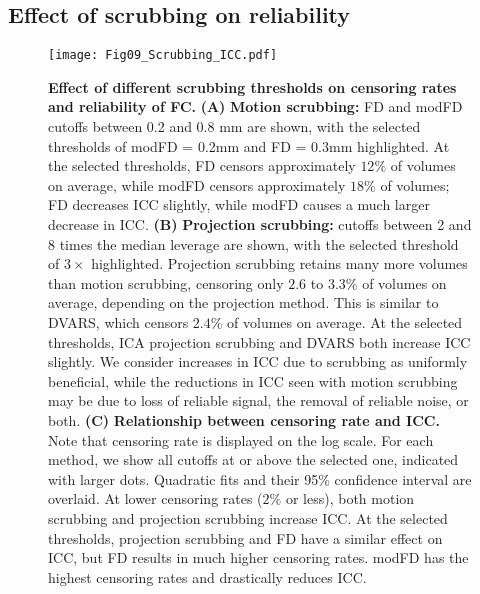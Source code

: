 \documentclass{article}
\begin{document}
\subsection{Effect of scrubbing on reliability}

\begin{figure}
    \centering
    \texttt{[image: Fig09\_Scrubbing\_ICC.pdf]}
    \caption{\small 
    \textbf{Effect of different scrubbing thresholds on censoring rates and reliability of FC.} 
    \textbf{(A)} \textbf{Motion scrubbing:} FD and modFD cutoffs between 0.2 and 0.8 mm are shown, with the selected thresholds of modFD = 0.2mm and FD = 0.3mm highlighted. At the selected thresholds, FD censors approximately $12\%$ %
    of volumes on average, while modFD censors approximately $18\%$ %
    of volumes; FD decreases ICC slightly, while modFD causes a much larger decrease in ICC. \textbf{(B)} \textbf{Projection scrubbing:} cutoffs between 2 and 8 times the median leverage are shown, with the selected threshold of $3\times$ highlighted.  Projection scrubbing retains many more volumes than motion scrubbing, censoring only $2.6$ to $3.3\%$ of volumes on average, depending on the projection method. This is similar to DVARS, which censors $2.4\%$ of volumes on average. At the selected thresholds, ICA projection scrubbing and DVARS both increase ICC slightly. We consider increases in ICC due to scrubbing as uniformly beneficial, while the reductions in ICC seen with motion scrubbing may be due to loss of reliable signal, the removal of reliable noise, or both.  \textbf{(C)} \textbf{Relationship between censoring rate and ICC.} Note that censoring rate is displayed on the log scale. For each method, we show all cutoffs at or above the selected one, indicated with larger dots. Quadratic fits and their 95\% confidence interval are overlaid. At lower censoring rates ($2\%$ or less), both motion scrubbing and projection scrubbing increase ICC. At the selected thresholds, projection scrubbing and FD have a similar effect on ICC, but FD results in much higher censoring rates. modFD has the highest censoring rates and drastically reduces ICC.}
    \label{fig:scrubICC}
\end{figure}
\end{document}

